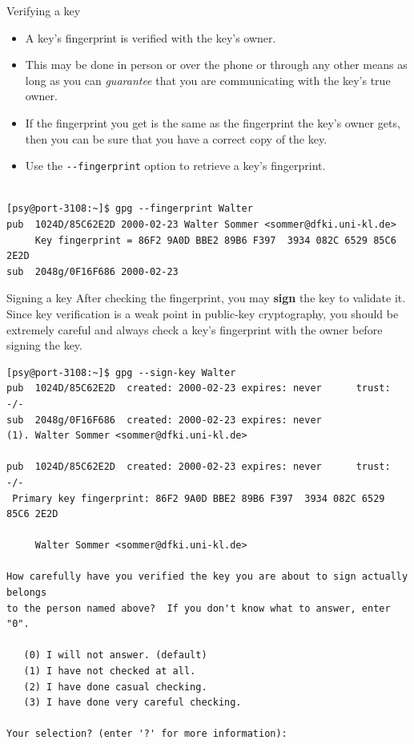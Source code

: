 \documentclass[%
mode=present,%
paper=smartboard,
size=20pt,
]{powerdot}
\newcommand{\clopt}[1]{\texttt{{-}#1}}
\begin{document}
\begin{slide}[method=direct]{Verifying a key}
  \begin{itemize}
  \item A key's fingerprint is verified with the key's owner.
  \item This may be done in person or over the phone or through any
    other means as long as you can \emph{guarantee} that you are
    communicating with the key's true owner.
  \item If the fingerprint you get is the same as the fingerprint the
    key's owner gets, then you can be sure that you have a correct
    copy of the key.
  \item Use the \clopt{-fingerprint} option to retrieve a key's
    fingerprint.
  \end{itemize}

\begin{verbatim}

[psy@port-3108:~]$ gpg --fingerprint Walter
pub  1024D/85C62E2D 2000-02-23 Walter Sommer <sommer@dfki.uni-kl.de>
     Key fingerprint = 86F2 9A0D BBE2 89B6 F397  3934 082C 6529 85C6 2E2D
sub  2048g/0F16F686 2000-02-23
\end{verbatim}%
\end{slide}

\makeatletter\renewcommand{\verbatim@font}{\tiny\tt}\makeatother
\begin{slide}[method=direct]{Signing a key}
  After checking the fingerprint, you may \textbf{sign} the key to
  validate it.  Since key verification is a weak point in public-key
  cryptography, you should be extremely careful and always check a
  key's fingerprint with the owner before signing the key.\\[1ex]
\begin{verbatim}
[psy@port-3108:~]$ gpg --sign-key Walter
pub  1024D/85C62E2D  created: 2000-02-23 expires: never      trust: -/-
sub  2048g/0F16F686  created: 2000-02-23 expires: never
(1). Walter Sommer <sommer@dfki.uni-kl.de>

pub  1024D/85C62E2D  created: 2000-02-23 expires: never      trust: -/-
 Primary key fingerprint: 86F2 9A0D BBE2 89B6 F397  3934 082C 6529 85C6 2E2D

     Walter Sommer <sommer@dfki.uni-kl.de>

How carefully have you verified the key you are about to sign actually belongs
to the person named above?  If you don't know what to answer, enter "0".

   (0) I will not answer. (default)
   (1) I have not checked at all.
   (2) I have done casual checking.
   (3) I have done very careful checking.

Your selection? (enter '?' for more information):
\end{verbatim}%
\end{slide}
\end{document}
